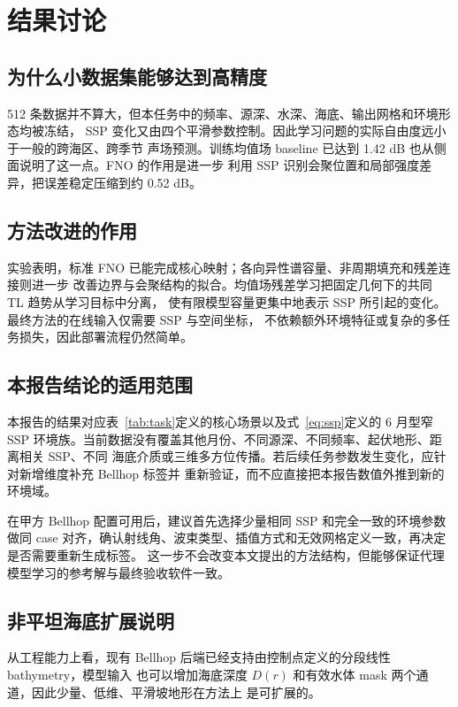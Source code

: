 \documentclass[UTF8,11pt]{ctexart}
\begin{document}
\section{结果讨论}

\subsection{为什么小数据集能够达到高精度}

512 条数据并不算大，但本任务中的频率、源深、水深、海底、输出网格和环境形态均被冻结，
SSP 变化又由四个平滑参数控制。因此学习问题的实际自由度远小于一般的跨海区、跨季节
声场预测。训练均值场 baseline 已达到 1.42 dB 也从侧面说明了这一点。FNO 的作用是进一步
利用 SSP 识别会聚位置和局部强度差异，把误差稳定压缩到约 0.52 dB。

\subsection{方法改进的作用}

实验表明，标准 FNO 已能完成核心映射；各向异性谱容量、非周期填充和残差连接则进一步
改善边界与会聚结构的拟合。均值场残差学习把固定几何下的共同 TL 趋势从学习目标中分离，
使有限模型容量更集中地表示 SSP 所引起的变化。最终方法的在线输入仅需要 SSP 与空间坐标，
不依赖额外环境特征或复杂的多任务损失，因此部署流程仍然简单。

\subsection{本报告结论的适用范围}

本报告的结果对应表~\ref{tab:task}定义的核心场景以及式~\eqref{eq:ssp}定义的 6 月型窄 SSP
环境族。当前数据没有覆盖其他月份、不同源深、不同频率、起伏地形、距离相关 SSP、不同
海底介质或三维多方位传播。若后续任务参数发生变化，应针对新增维度补充 Bellhop 标签并
重新验证，而不应直接把本报告数值外推到新的环境域。

在甲方 Bellhop 配置可用后，建议首先选择少量相同 SSP 和完全一致的环境参数做同 case
对齐，确认射线角、波束类型、插值方式和无效网格定义一致，再决定是否需要重新生成标签。
这一步不会改变本文提出的方法结构，但能够保证代理模型学习的参考解与最终验收软件一致。

\subsection{非平坦海底扩展说明}

从工程能力上看，现有 Bellhop 后端已经支持由控制点定义的分段线性 bathymetry，模型输入
也可以增加海底深度 $D(r)$ 和有效水体 mask 两个通道，因此少量、低维、平滑坡地形在方法上
是可扩展的。
\end{document}
